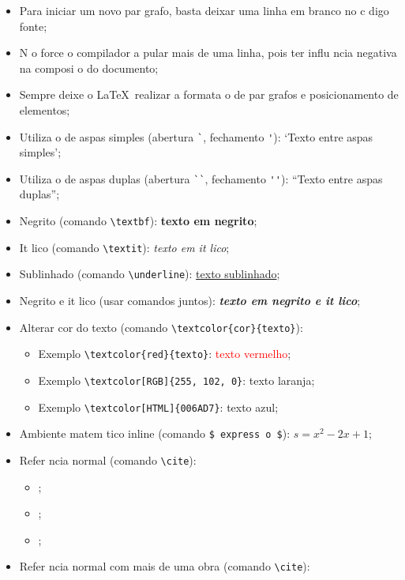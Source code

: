 \documentclass{article}
\begin{document}
     \begin{itemize}
     	\item Para iniciar um novo par grafo, basta deixar uma linha em branco no c digo fonte;
     	\item N o force o compilador a pular mais de uma linha, pois ter  influ ncia negativa na composi o do documento;
     	\item Sempre deixe o \LaTeX\ realizar a formata o de par grafos e posicionamento de elementos;
     	\item Utiliza o de aspas simples (abertura \verb|`|, fechamento \verb|'|): `Texto entre aspas simples';
     	\item Utiliza o de aspas duplas (abertura \verb|``|, fechamento \verb|''|): ``Texto entre aspas duplas'';
     	\item Negrito (comando \verb|\textbf|): \textbf{texto em negrito};
     	\item It lico (comando \verb|\textit|): \textit{texto em it lico};
     	\item Sublinhado (comando \verb|\underline|): \underline{texto sublinhado};
     	\item Negrito e it lico (usar comandos juntos): \textbf{\textit{texto em negrito e it lico}};
     	\item Alterar cor do texto (comando \verb|\textcolor{cor}{texto}|):
     	\begin{itemize}
     		\item Exemplo \verb|\textcolor{red}{texto}|: \textcolor{red}{texto vermelho};
     		\item Exemplo \verb|\textcolor[RGB]{255, 102, 0}|: \textcolor[RGB]{255, 102, 0}{texto laranja};
     		\item Exemplo \verb|\textcolor[HTML]{006AD7}|: \textcolor[HTML]{006AD7}{texto azul};
     	\end{itemize}
     	\item Ambiente matem tico inline (comando \verb|$ express o $|): $s = x^2-2x +1$;
     	\item Refer ncia normal (comando \verb|\cite|):
     	\begin{itemize}
     		\item \cite{Agaisse1995};
     		\item \cite{Abedi2014};
     		\item \cite{BtNomenclature2016};
     	\end{itemize}
     	\item Refer ncia normal com mais de uma obra (comando \verb|\cite|):

\end{itemize}
\end{document}
